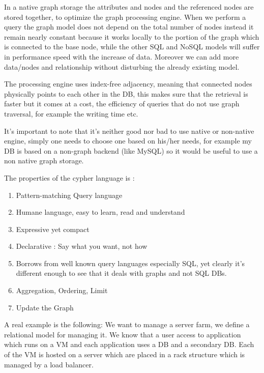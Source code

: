 \documentclass[a4page, 11pt]{article}
\begin{document}
In a native graph storage the attributes and nodes and the referenced
nodes are stored together, to optimize the graph processing engine. When
we perform a query the graph model does not depend on the total number
of nodes instead it remain nearly constant because it works locally to
the portion of the graph which is connected to the base node, while the
other SQL and NoSQL models will suffer in performance speed with the
increase of data. Moreover we can add more data/nodes and relationship
without disturbing the already existing model.

The processing engine uses index-free adjacency, meaning that connected
nodes physically points to each other in the DB, this makes sure that
the retrieval is faster but it comes at a cost, the efficiency of
queries that do not use graph traversal, for example the writing time
etc.

It's important to note that it's neither good nor bad to use native or
non-native engine, simply one needs to choose one based on his/her
needs, for example my DB is based on a non-graph backend (like MySQL) so
it would be useful to use a non native graph storage.

The properties of the cypher language is :

\begin{enumerate}[noitemsep]
	 
	\item
	Pattern-matching Query language
	\item
	Humane language, easy to learn, read and understand
	\item
	Expressive yet compact
	\item
	Declarative : Say what you want, not how
	\item
	Borrows from well known query languages especially SQL, yet clearly
	it's different enough to see that it deals with graphs and not SQL
	DBs.
	\item
	Aggregation, Ordering, Limit
	\item
	Update the Graph
\end{enumerate}

A real example is the following: We want to manage a server farm, we
define a relational model for managing it. We know that a user access to
application which runs on a VM and each application uses a DB and a
secondary DB. Each of the VM is hosted on a server which are placed in a
rack structure which is managed by a load balancer.
\end{document}

